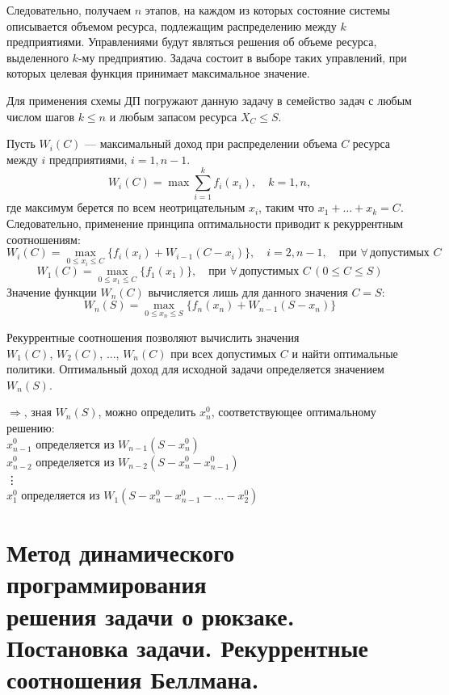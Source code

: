\documentclass[17pt]{extarticle}
\begin{document}
Следовательно, получаем \( n \) этапов, на каждом из которых состояние системы описывается объемом ресурса,
подлежащим распределению между \( k \) предприятиями.
Управлениями будут являться решения об объеме ресурса, выделенного \( k \)-му предприятию.
Задача состоит в выборе таких управлений, при которых целевая функция принимает максимальное значение.

Для применения схемы ДП погружают данную задачу в семейство
задач с любым числом шагов $k \leq n$ и любым запасом ресурса $X_C \leq S$.

Пусть \( W_i(C) \) — максимальный доход при распределении объема \( C \) ресурса между \( i \) предприятиями, \( i = 1, n-1 \).
\[
    W_i(C) = \max \sum_{i=1}^k f_i(x_i), \quad k = 1, n,
\]
где максимум берется по всем неотрицательным \( x_i \), таким что \( x_1 + \ldots + x_k = C \).
Следовательно, применение принципа оптимальности приводит к рекуррентным соотношениям:
\[
    W_i(C) = \max_{0 \leq x_i \leq C} \{ f_i(x_i) + W_{i-1}(C - x_i) \}, \quad i = 2, n-1, \quad \text{при } \forall \, \text{допустимых } C
\]
\[
    W_1(C) = \max_{0 \leq x_1 \leq C} \{ f_1(x_1) \}, \quad \text{при } \forall \, \text{допустимых } C \, (0 \leq C \leq S)
\]
Значение функции \( W_n(C) \) вычисляется лишь для данного значения \( C = S \):
\[
    W_n(S) = \max_{0 \leq x_n \leq S} \{ f_n(x_n) + W_{n-1}(S - x_n) \}
\]

Рекуррентные соотношения позволяют вычислить значения \\ \( W_1(C) \), \( W_2(C) \), ..., \( W_n(C) \)
при всех допустимых \( C \) и найти оптимальные политики. Оптимальный доход для исходной задачи определяется значением \( W_n(S) \).

$\Rightarrow$, зная $W_n(S)$, можно определить $x_n^0$, соответствующее оптимальному решению: \\
\( x_{n-1}^0 \) определяется из \( W_{n-1}(S - x_n^0) \) \\
\( x_{n-2}^0 \) определяется из \( W_{n-2}(S - x_n^0 - x_{n-1}^0) \) \\
\vdots \\
\( x_1^0 \) определяется из \( W_1(S - x_n^0 - x_{n-1}^0 - \ldots - x_2^0) \) \\






\section{Метод динамического программирования \\ решения задачи о рюкзаке. Постановка задачи. Рекуррентные соотношения Беллмана.}
\end{document}
